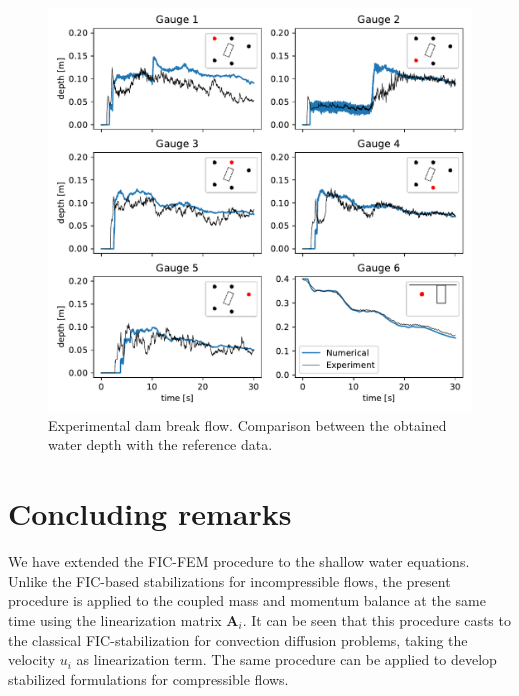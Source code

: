 \documentclass[a4paper,12pt]{article}
\newcommand\IgnasiCorregit[1]{\ifthenelse{\boolean{show_corregit}}{\textcolor{blue}{#1}}{}}
\newcommand\Miguel[1]{\ifthenelse{\boolean{show_corregit}}{\textcolor{red}{#1}}{}}
\begin{document}
\begin{figure}
\centering
\includegraphics[width=\textwidth]{img/exp/gauges.pdf}
\caption{Experimental dam break flow. Comparison between the obtained water depth with the reference data.}
\label{experiment_gauges}
\end{figure}



\section{Concluding remarks} \label{sec:conclusions}

We have extended the FIC-FEM procedure to the shallow water equations. Unlike the FIC-based stabilizations for incompressible flows, the present procedure is applied to the coupled mass and momentum balance at the same time using the linearization matrix $\mathbf{A}_i$. It can be seen that this procedure casts to the classical FIC-stabilization for convection diffusion problems, taking the velocity $u_i$ as linearization term. The same procedure can be applied to develop stabilized formulations for compressible flows.
\end{document}
